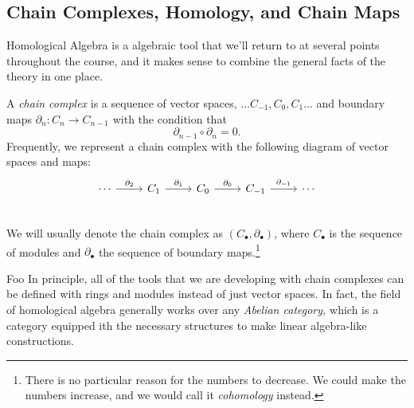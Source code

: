 \subsection{Chain Complexes, Homology, and Chain Maps}
Homological Algebra is a algebraic tool that we'll return to at several points throughout the course, and it makes sense to combine the general facts of the theory in one place. 
\begin{definition}  A \emph{chain complex} is a sequence of vector spaces, $\ldots C_{-1},C_{0},C_{1}\ldots$ and boundary maps $\partial_n:C_n\to C_{n-1}$ with the condition that $$\partial_{n-1}\circ \partial_{n}=0.$$ Frequently, we represent a chain complex with the following diagram of vector spaces and maps: $$
\begin{tikzcd}
    \cdots\arrow{r}{\partial_{2}}&    C_{1}\arrow{r}{\partial_{1}} &C_{0} \arrow{r}{\partial_0}  &C_{-1}\arrow{r}{\partial_{-1}}&\cdots \\
\end{tikzcd}$$ We will usually denote the chain complex as $( C_\bullet, \partial_\bullet)$, where $C_\bullet$ is the sequence of modules and $\partial_\bullet$ the sequence of boundary maps.\footnote{There is no particular reason for the numbers to decrease. We could make the numbers increase, and we would call it \emph{cohomology} instead.} \label{def:chaincomplex}
\end{definition}
\begin{projectdescription}{Foo}
In principle, all of the tools that we are developing with chain complexes can be defined with rings and modules instead of just vector spaces. In fact, the field of homological algebra generally works \label{proj:abelian} over any  \emph{Abelian category,} which is a category equipped ith the necessary structures to make linear algebra-like constructions. 
\end{projectdescription}
